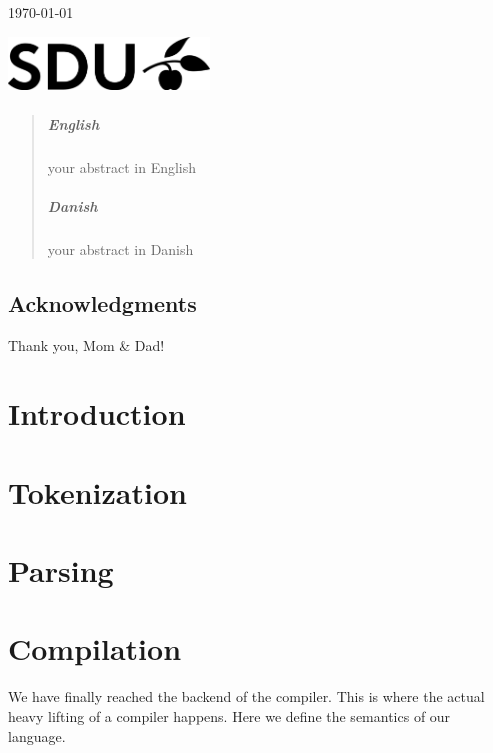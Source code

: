 \documentclass[a4paper,12pt]{report}
\begin{document}
\begin{titlepage}
\vfill\vfill

{\large\today} %

\vfill\vfill
\includegraphics[width=0.4\textwidth]{SDU_BLACK_RGB.png}\\[1cm]

\vfill

\end{titlepage}


\begin{abstract}
\paragraph{English}
your abstract in English

\paragraph{Danish}
your abstract in Danish
\end{abstract}

\newpage
\section*{Acknowledgments}
Thank you, Mom \& Dad!

\newpage
\tableofcontents

\newpage
{} 
\setcounter{page}{1}

\chapter{Introduction}

\chapter{Tokenization}

\chapter{Parsing}


\chapter{Compilation}
We have finally reached the backend of the compiler. This is where the actual heavy lifting of a compiler happens. Here we define the semantics of our language. 
\end{document}
